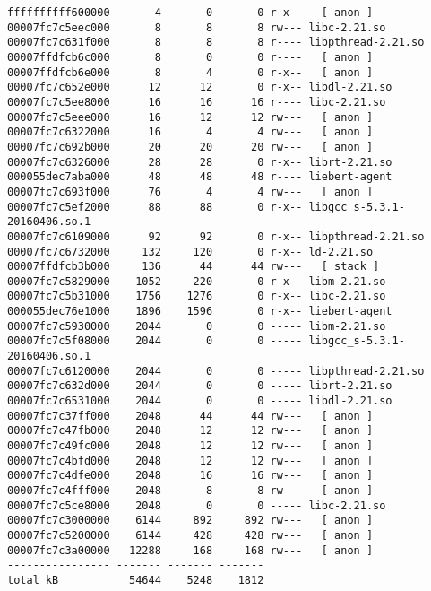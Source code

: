 \begin{verbatim}
ffffffffff600000       4       0       0 r-x--   [ anon ]
00007fc7c5eec000       8       8       8 rw--- libc-2.21.so
00007fc7c631f000       8       8       8 r---- libpthread-2.21.so
00007ffdfcb6c000       8       0       0 r----   [ anon ]
00007ffdfcb6e000       8       4       0 r-x--   [ anon ]
00007fc7c652e000      12      12       0 r-x-- libdl-2.21.so
00007fc7c5ee8000      16      16      16 r---- libc-2.21.so
00007fc7c5eee000      16      12      12 rw---   [ anon ]
00007fc7c6322000      16       4       4 rw---   [ anon ]
00007fc7c692b000      20      20      20 rw---   [ anon ]
00007fc7c6326000      28      28       0 r-x-- librt-2.21.so
000055dec7aba000      48      48      48 r---- liebert-agent
00007fc7c693f000      76       4       4 rw---   [ anon ]
00007fc7c5ef2000      88      88       0 r-x-- libgcc_s-5.3.1-20160406.so.1
00007fc7c6109000      92      92       0 r-x-- libpthread-2.21.so
00007fc7c6732000     132     120       0 r-x-- ld-2.21.so
00007ffdfcb3b000     136      44      44 rw---   [ stack ]
00007fc7c5829000    1052     220       0 r-x-- libm-2.21.so
00007fc7c5b31000    1756    1276       0 r-x-- libc-2.21.so
000055dec76e1000    1896    1596       0 r-x-- liebert-agent
00007fc7c5930000    2044       0       0 ----- libm-2.21.so
00007fc7c5f08000    2044       0       0 ----- libgcc_s-5.3.1-20160406.so.1
00007fc7c6120000    2044       0       0 ----- libpthread-2.21.so
00007fc7c632d000    2044       0       0 ----- librt-2.21.so
00007fc7c6531000    2044       0       0 ----- libdl-2.21.so
00007fc7c37ff000    2048      44      44 rw---   [ anon ]
00007fc7c47fb000    2048      12      12 rw---   [ anon ]
00007fc7c49fc000    2048      12      12 rw---   [ anon ]
00007fc7c4bfd000    2048      12      12 rw---   [ anon ]
00007fc7c4dfe000    2048      16      16 rw---   [ anon ]
00007fc7c4fff000    2048       8       8 rw---   [ anon ]
00007fc7c5ce8000    2048       0       0 ----- libc-2.21.so
00007fc7c3000000    6144     892     892 rw---   [ anon ]
00007fc7c5200000    6144     428     428 rw---   [ anon ]
00007fc7c3a00000   12288     168     168 rw---   [ anon ]
---------------- ------- ------- -------
total kB           54644    5248    1812
            \end{verbatim}
            
